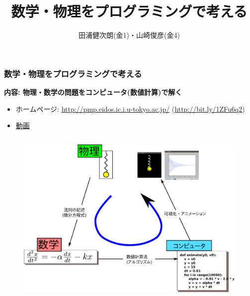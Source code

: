 \documentclass[10pt,dvipdfmx]{beamer}
\title{数学・物理をプログラミングで考える}
\institute{}
\author{田浦健次朗(金1)・山崎俊彦(金4)}
\date{}
\newcommand{\ao}[1]{{\color{blue}#1}}
\begin{document}

\begin{frame}[fragile]
\frametitle{数学・物理をプログラミングで考える \\
\hspace{\fill}{\small 田浦健次朗(金1)・山崎俊彦(金4)}
}

\begin{center}
\ao{\bf\large 内容: 物理・数学の問題をコンピュータ(数値計算)で解く}

\begin{itemize}
\item ホームページ: {\small \url{http://pmp.eidos.ic.i.u-tokyo.ac.jp/} (\url{http://bit.ly/1ZFu6q2})}
\item \href{https://drive.google.com/file/d/19l28PFQxVEDzwYXShu46IpKoPvgvd3z-/view?usp=sharing}{動画}
\end{itemize}

\end{center}

\begin{columns}
\begin{column}{0.5\textwidth}

\begin{figure}[htbp]
\begin{center}
\includegraphics[width=\textwidth]{out/pdf/svg/math_phys_prog_3.pdf}
\end{center}
\end{figure}
\end{column}


\end{columns}
\end{frame}
\end{document}

